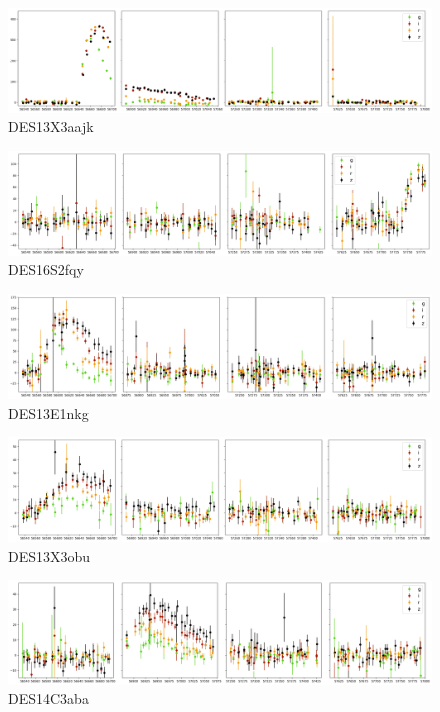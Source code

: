 \begin{figure}[H]
  \centering
  \includegraphics[width=\textwidth]{Figures/Appendix/CNN/1262762.png}
  \caption{DES13X3aajk}
\end{figure}

\begin{figure}[H]
  \centering
  \includegraphics[width=\textwidth]{Figures/Appendix/CNN/1655035.png}
  \caption{DES16S2fqy}
\end{figure}

\begin{figure}[H]
  \centering
  \includegraphics[width=\textwidth]{Figures/Appendix/CNN/1255005.png}
  \caption{DES13E1nkg}
\end{figure}

\begin{figure}[H]
  \centering
  \includegraphics[width=\textwidth]{Figures/Appendix/CNN/1258417.png}
  \caption{DES13X3obu}
\end{figure}

\begin{figure}[H]
  \centering
  \includegraphics[width=\textwidth]{Figures/Appendix/CNN/1290501.png}
  \caption{DES14C3aba}
\end{figure}

